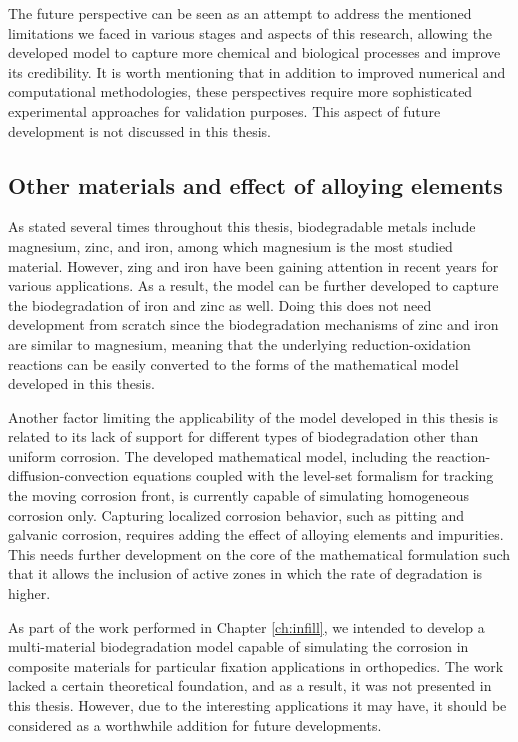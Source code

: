 The future perspective can be seen as an attempt to address the mentioned limitations we faced in various stages and aspects of this research, allowing the developed model to capture more chemical and biological processes and improve its credibility. It is worth mentioning that in addition to improved numerical and computational methodologies, these perspectives require more sophisticated experimental approaches for validation purposes. This aspect of future development is not discussed in this thesis.

\subsection{Other materials and effect of alloying elements} \label{sec:conclusion_alloy}

As stated several times throughout this thesis, biodegradable metals include magnesium, zinc, and iron, among which magnesium is the most studied material. However, zing and iron have been gaining attention in recent years for various applications. As a result, the model can be further developed to capture the biodegradation of iron and zinc as well. Doing this does not need development from scratch since the biodegradation mechanisms of zinc and iron are similar to magnesium, meaning that the underlying reduction-oxidation reactions can be easily converted to the forms of the mathematical model developed in this thesis.

Another factor limiting the applicability of the model developed in this thesis is related to its lack of support for different types of biodegradation other than uniform corrosion. The developed mathematical model, including the reaction-diffusion-convection equations coupled with the level-set formalism for tracking the moving corrosion front, is currently capable of simulating homogeneous corrosion only. Capturing localized corrosion behavior, such as pitting and galvanic corrosion, requires adding the effect of alloying elements and impurities. This needs further development on the core of the mathematical formulation such that it allows the inclusion of active zones in which the rate of degradation is higher.

As part of the work performed in Chapter \ref{ch:infill}, we intended to develop a multi-material biodegradation model capable of simulating the corrosion in composite materials for particular fixation applications in orthopedics. The work lacked a certain theoretical foundation, and as a result, it was not presented in this thesis. However, due to the interesting applications it may have, it should be considered as a worthwhile addition for future developments.

